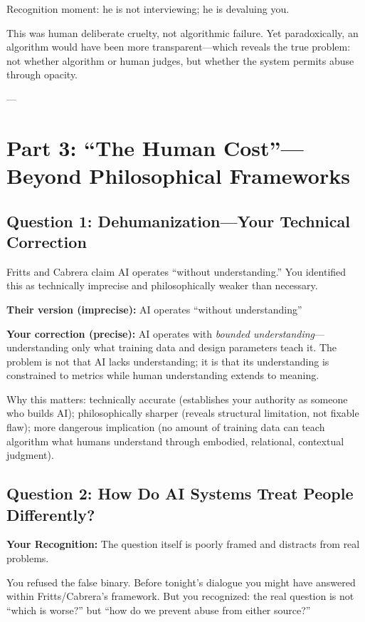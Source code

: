 \documentclass[11pt,twoside]{article}
\begin{document}
Recognition moment: he is not interviewing; he is devaluing you.

This was human deliberate cruelty, not algorithmic failure. Yet paradoxically, an algorithm would have been more transparent---which reveals the true problem: not whether algorithm or human judges, but whether the system permits abuse through opacity.

---

\section{Part 3: ``The Human Cost''---Beyond Philosophical Frameworks}

\subsection{Question 1: Dehumanization---Your Technical Correction}

Fritts and Cabrera claim AI operates ``without understanding.'' You identified this as technically imprecise and philosophically weaker than necessary.

\textbf{Their version (imprecise):} AI operates ``without understanding''

\textbf{Your correction (precise):} AI operates with \textit{bounded understanding}---understanding only what training data and design parameters teach it. The problem is not that AI lacks understanding; it is that its understanding is constrained to metrics while human understanding extends to meaning.

Why this matters: technically accurate (establishes your authority as someone who builds AI); philosophically sharper (reveals structural limitation, not fixable flaw); more dangerous implication (no amount of training data can teach algorithm what humans understand through embodied, relational, contextual judgment).

\subsection{Question 2: How Do AI Systems Treat People Differently?}

\textbf{Your Recognition:} The question itself is poorly framed and distracts from real problems.

You refused the false binary. Before tonight's dialogue you might have answered within Fritts/Cabrera's framework. But you recognized: the real question is not ``which is worse?'' but ``how do we prevent abuse from either source?''
\end{document}
